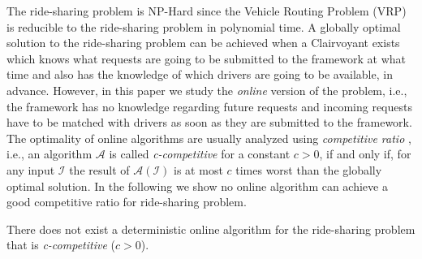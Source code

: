 \begin{definition} 
The ride-sharing problem is NP-Hard since the Vehicle Routing Problem (VRP) \cite{Dantzig59} is reducible to the ride-sharing problem in polynomial time. A globally optimal solution to the ride-sharing problem can be achieved when a Clairvoyant exists which knows what requests are going to be submitted to the framework at what time and also has the knowledge of which drivers are going to be available, in advance. However, in this paper we study the \textit{online} version of the problem, i.e., the framework has no knowledge regarding future requests and incoming requests have to be matched with drivers as soon as they are submitted to the framework. The optimality of online algorithms are usually analyzed using \textit{competitive ratio} \cite{Sleator85}, i.e., an algorithm $\mathcal{A}$ is called \textit{c-competitive} for a constant $c > 0$, if and only if, for any input $\mathcal{I}$ the result of $\mathcal{A}(\mathcal{I})$ is at most $c$ times worst than the globally optimal solution. In the following we show no online algorithm can achieve a good competitive ratio for ride-sharing problem.

\begin{theorem}
\label{th:comp_ratio}
There does not exist a deterministic online algorithm for the ride-sharing problem that is \textit{c-competitive} ($c > 0$). 
\end{theorem}


\end{definition}
